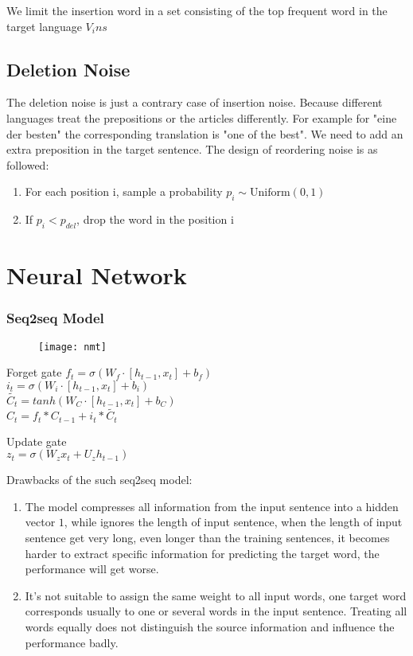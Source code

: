	We limit the insertion word in a set consisting of the top frequent word in the target language ${V_ins}$

	\subsection{Deletion Noise}
	The deletion noise is just a contrary case of insertion noise. Because different languages treat the prepositions or the articles differently. For example for "eine der besten" the corresponding translation is "one of the best". We need to add an extra preposition in the target sentence.  The design of reordering noise is as followed:
	
	\begin{enumerate}
		\item For each position i, sample a probability ${p_i \sim \textrm{Uniform}(0,1)}$
		\item If ${p_i} < p_{del}$, drop the word in the position i
	\end{enumerate}
	
	
	
	
	\section{Neural Network}
	\subsubsection{Seq2seq Model}
	\begin{figure}[t]
		\texttt{[image: nmt]}
		\centering
	\end{figure}
	
	Forget gate
	${f_t = \sigma(W_f\cdot[h_{t-1}, x_t] + b_f)}$\\
	
	${i_t = \sigma(W_i \cdot [h_{t-1}, x_t] + b_i)}$\\
	${\tilde{C_t} = tanh(W_C\cdot [h_{t-1}, x_t] + b_C)}$\\
	${C_t =  f_t * C_{t-1} + i_t * \tilde{C_t}}$
	
	Update gate\\
	$z_t = \sigma (W_z x_t + U_z h_{t-1} )$
	
	Drawbacks of the such seq2seq model:
	\begin{enumerate}
	\item The model compresses all information from the input sentence into a hidden vector ${1}$, while ignores the length of input sentence, when the length of input sentence get very long, even longer than the training sentences, it becomes harder to extract specific information for predicting the target word, the performance will get worse.
	\item It's not suitable to assign the same weight to all input words, one target word corresponds usually to one or several words in the input sentence. Treating all words equally does not distinguish the source information and influence the performance badly.
	\end{enumerate}
	
